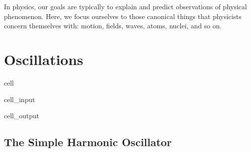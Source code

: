 \documentclass[letterpaper,10pt,english]{jupyterBook}
\begin{document}
\sphinxAtStartPar
In physics, our goals are typically to explain and predict observations of physical phenomenon. Here, we focus ourselves to those canonical things that physicists concern themselves with: motion, fields, waves, atoms, nuclei, and so on.

\sphinxstepscope


\chapter{Oscillations}
\label{\detokenize{content/2_oscillations/readings-oscillators:oscillations}}\label{\detokenize{content/2_oscillations/readings-oscillators::doc}}
\sphinxAtStartPar
{}

\begin{sphinxuseclass}{cell}\begin{sphinxVerbatimInput}

\begin{sphinxuseclass}{cell_input}
\begin{sphinxVerbatim}[commandchars=\\\{\}]
   
  
\end{sphinxVerbatim}

\end{sphinxuseclass}\end{sphinxVerbatimInput}
\begin{sphinxVerbatimOutput}

\begin{sphinxuseclass}{cell_output}
\noindent{}

\end{sphinxuseclass}\end{sphinxVerbatimOutput}

\end{sphinxuseclass}
\sphinxstepscope


\section{The Simple Harmonic Oscillator}
\label{\detokenize{content/2_oscillations/readings-SHO-intro:the-simple-harmonic-oscillator}}\label{\detokenize{content/2_oscillations/readings-SHO-intro::doc}}
\end{document}
